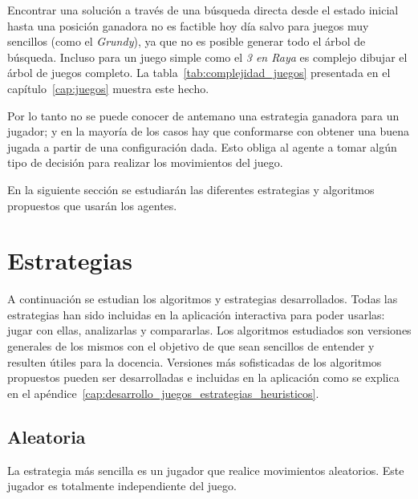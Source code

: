 Encontrar una solución a través de una búsqueda directa desde el estado inicial hasta una posición ganadora no es factible hoy día salvo para juegos muy sencillos (como el \textit{Grundy}), ya que no es posible generar todo el árbol de búsqueda.
Incluso para un juego simple como el \textit{3 en Raya} es complejo dibujar el árbol de juegos completo.
La tabla~\ref{tab:complejidad_juegos} presentada en el capítulo~\ref{cap:juegos} muestra este hecho.

Por lo tanto no se puede conocer de antemano una estrategia ganadora para un jugador; y en la mayoría de los casos hay que conformarse con obtener una buena jugada a partir de una configuración dada.
Esto obliga al agente a tomar algún tipo de decisión para realizar los movimientos del juego.

\bigskip
En la siguiente sección se estudiarán las diferentes estrategias y algoritmos propuestos que usarán los agentes.

\section{Estrategias}
\label{sec:estrategias}
A continuación se estudian los algoritmos y estrategias desarrollados.
Todas las estrategias han sido incluidas en la aplicación interactiva para poder usarlas: jugar con ellas, analizarlas y compararlas.
Los algoritmos estudiados son versiones generales de los mismos con el objetivo de que sean sencillos de entender y resulten útiles para la docencia.
Versiones más sofisticadas de los algoritmos propuestos pueden ser desarrolladas e incluidas en la aplicación como se explica en el apéndice~\ref{cap:desarrollo_juegos_estrategias_heuristicos}.


\subsection{Aleatoria}
\label{ssec:aleatoria}
La estrategia más sencilla es un jugador que realice movimientos aleatorios.
Este jugador es totalmente independiente del juego.

